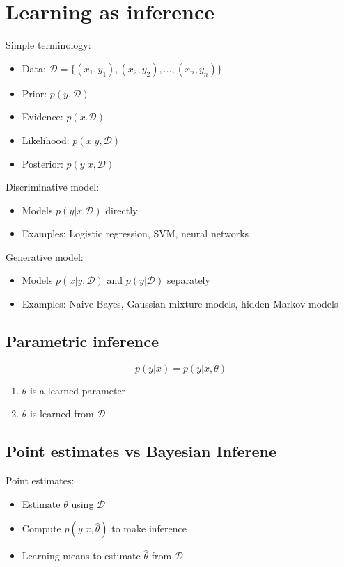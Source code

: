\documentclass[12pt,a4paper]{article}
\begin{document}

\section{Learning as inference}
Simple terminology:
\begin{itemize}
    \item Data: $\mathcal{D} = \{(x_1, y_1), (x_2, y_2), \ldots, (x_n, y_n)\}$
    \item Prior: $p(y, \mathcal{D})$
    \item Evidence: $p(x.\mathcal{D})$
    \item Likelihood: $p(x|y, \mathcal{D})$
    \item Posterior: $p(y|x, \mathcal{D})$
\end{itemize}

Discriminative model:
\begin{itemize}
    \item Models $p(y|x. \mathcal{D})$ directly 
    \item Examples: Logistic regression, SVM, neural networks
\end{itemize}

Generative model:
\begin{itemize}
    \item Models $p(x|y, \mathcal{D})$ and $p(y|\mathcal{D})$ separately
    \item Examples: Naive Bayes, Gaussian mixture models, hidden Markov models
\end{itemize}

\subsection{Parametric inference}
\[
p(y|x) = p(y|x, \theta)
\]
\begin{enumerate}
    \item $\theta$ is a learned parameter
    \item $\theta$ is learned from $\mathcal{D}$
\end{enumerate}

\subsection{Point estimates vs Bayesian Inferene}
Point estimates:
\begin{itemize}
    \item Estimate $\theta$ using $\mathcal{D}$
    \item Compute $p(y|x, \hat{\theta})$ to make inference 
    \item Learning means to estimate $\hat{\theta}$ from $\mathcal{D}$
\end{itemize}
\end{document}
